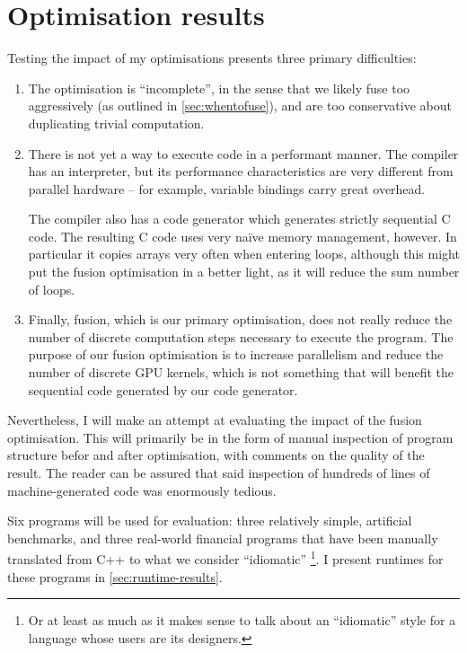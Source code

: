 \chapter{Optimisation results}
\label{chap:optimisation-results}

Testing the impact of my optimisations presents three primary
difficulties:

\begin{enumerate}
\item The optimisation is ``incomplete'', in the sense that we likely
  fuse too aggressively (as outlined in \cref{sec:whentofuse}), and
  are too conservative about duplicating trivial computation.

\item There is not yet a way to execute \LO{} code in a performant
  manner.  The \LO{} compiler has an interpreter, but its performance
  characteristics are very different from parallel hardware -- for
  example, variable bindings carry great overhead.

  The compiler also has a code generator which generates strictly
  sequential C code.  The resulting C code uses very naïve memory
  management, however.  In particular it copies arrays very often when
  entering loops, although this might put the fusion optimisation in a
  better light, as it will reduce the sum number of loops.

\item Finally, fusion, which is our primary optimisation, does not
  really reduce the number of discrete computation steps necessary to
  execute the program.  The purpose of our fusion optimisation is to
  increase parallelism and reduce the number of discrete GPU kernels,
  which is not something that will benefit the sequential code
  generated by our code generator.
\end{enumerate}

Nevertheless, I will make an attempt at evaluating the impact of the
fusion optimisation.  This will primarily be in the form of manual
inspection of program structure befor and after optimisation, with
comments on the quality of the result.  The reader can be assured that
said inspection of hundreds of lines of machine-generated code was
enormously tedious.

Six programs will be used for evaluation: three relatively simple,
artificial benchmarks, and three real-world financial programs that
have been manually translated from C++ to what we consider
``idiomatic'' \LO{}\footnote{Or at least as much as it makes sense to
  talk about an ``idiomatic'' style for a language whose users are its
  designers.}.  I present runtimes for these programs in
\cref{sec:runtime-results}.


